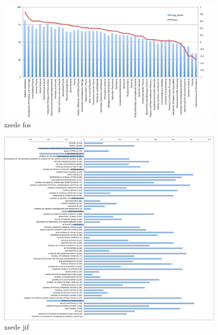 \documentclass{sig-alternate}
\begin{document}
\begin{figure}[htb] 
  \centering 
    \includegraphics[width=1.0\textwidth]{images-new/xsede-vs-peers-by-fos.pdf} 
  \caption{xsede fos}\label{F:xsede-fos} 
\end{figure} 

\begin{figure}[htb] 
  \centering 
    \includegraphics[width=1.0\textwidth]{images-new/xsede-journal-bar-by-jif.pdf} 
  \caption{xsede jif}\label{F:xsede-jif} 
\end{figure} 
\end{document}
